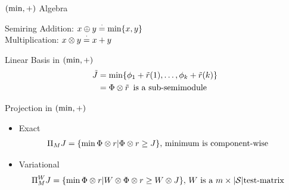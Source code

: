 \documentclass[10pt,handout]{beamer}
\begin{document}
\begin{frame}[fragile]{$(\min,+)$ Algebra}

\begin{block}{Semiring}
Addition: $x\oplus y\stackrel{\cdot}{=}\min\{x,y\}$\\
Multiplication: $x\otimes y\stackrel{\cdot}{=} x+y$
\end{block}

\begin{block}{Linear Basis in $(\min,+)$ }
\begin{align*}
\tilde{J}&=\min\{\phi_{1}+\tilde{r}(1),\ldots,\phi_{k}+\tilde{r}(k)\}\\
&=\Phi \otimes \tilde{r} \,\text{~is~a~sub-semimodule}
\end{align*}
\end{block}

\begin{block}{Projection in $(\min,+)$}
\begin{itemize}
\item Exact
\begin{align*}
\Pi_M J&=\{\min \Phi \otimes r | \Phi \otimes r \geq J\},\,\text{minimum~is~component-wise}
\end{align*}
\item Variational
\begin{align*}
\Pi^W_M J&=\{\min \Phi \otimes r | W\otimes \Phi \otimes r \geq W\otimes J\},\,W\text{~is~a~$m\times |\mathcal{S}|$test-matrix}
\end{align*}
\end{itemize}

\end{block}




\end{frame}
\end{document}
